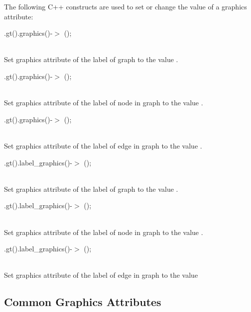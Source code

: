 \documentclass[twoside,fleqn]{report}
\begin{document}
The following C++ constructs are used to set or change the value
of a graphics attribute:

\begin{ttdescription}
  
  \item[\Param{g}.gt().graphics()-$>$\Param{a} (\Param{new\_a});]
  \strut\\
  Set graphics attribute  of the label of graph
   to the value .
    
  \item[\Param{g}.gt(\Param{n}).graphics()-$>$\Param{a} (\Param{new\_a});]
  \strut\\
  Set graphics attribute  of the label of node 
  in graph  to the value .
  
  \item[\Param{g}.gt(\Param{e}).graphics()-$>$\Param{a} (\Param{new\_a});]
  \strut\\
  Set graphics attribute  of the label of edge 
  in graph  to the value .
  
  \item[\Param{g}.gt().label\_graphics()-$>$\Param{a} (\Param{new\_a});]
  \strut\\
  Set graphics attribute  of the label of graph  
  to the value .
  
  \item[\Param{g}.gt(\Param{n}).label\_graphics()-$>$\Param{a} (\Param{new\_a});]
  \strut\\
  Set graphics attribute  of the label of node  in 
  graph  to the value .
  
  \item[\Param{g}.gt(\Param{e}).label\_graphics()-$>$\Param{a} (\Param{new\_a});]
  \strut\\
  Set graphics attribute  of the label of edge  in 
  graph  to the value 

\end{ttdescription}


%
%

\subsection{Common Graphics Attributes}
\label{s:Attributes:CommonGraphics}
\end{document}
